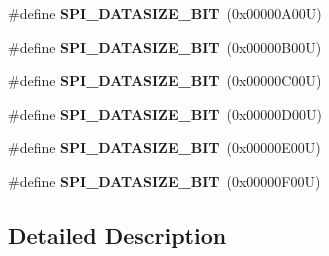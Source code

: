 \begin{DoxyCompactItemize}
\mbox{\label{group___s_p_i___data___size_gac89fef02c2b72a45f0d9bd4b9108464f}} 
\#define {\bfseries S\+P\+I\+\_\+\+D\+A\+T\+A\+S\+I\+Z\+E\+\_\+B\+IT}~(0x00000\+A00\+U)
\item 
\mbox{\label{group___s_p_i___data___size_ga6156f3714711c5aa25444cb0db4de48e}} 
\#define {\bfseries S\+P\+I\+\_\+\+D\+A\+T\+A\+S\+I\+Z\+E\+\_\+B\+IT}~(0x00000\+B00\+U)
\item 
\mbox{\label{group___s_p_i___data___size_ga99da120c51ef48974fea4a9da210184c}} 
\#define {\bfseries S\+P\+I\+\_\+\+D\+A\+T\+A\+S\+I\+Z\+E\+\_\+B\+IT}~(0x00000\+C00\+U)
\item 
\mbox{\label{group___s_p_i___data___size_gac9b8f5abf1d7d31f2d814e5f19546df9}} 
\#define {\bfseries S\+P\+I\+\_\+\+D\+A\+T\+A\+S\+I\+Z\+E\+\_\+B\+IT}~(0x00000\+D00\+U)
\item 
\mbox{\label{group___s_p_i___data___size_ga36b5ba62b97fae23c1162a87b256ca45}} 
\#define {\bfseries S\+P\+I\+\_\+\+D\+A\+T\+A\+S\+I\+Z\+E\+\_\+B\+IT}~(0x00000\+E00\+U)
\item 
\mbox{\label{group___s_p_i___data___size_ga902147b9ead27cd9333240c72ce74f59}} 
\#define {\bfseries S\+P\+I\+\_\+\+D\+A\+T\+A\+S\+I\+Z\+E\+\_\+B\+IT}~(0x00000\+F00\+U)
\end{DoxyCompactItemize}


\subsection{Detailed Description}

